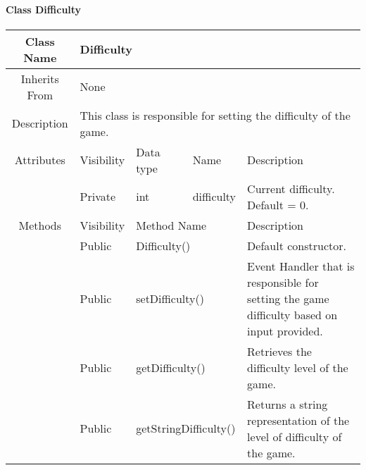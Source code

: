 \paragraph{Class Difficulty}\mbox{}
\begin{tabularx}{\textwidth}{|c||l|l|l|X|}
    \hline
    \cellcolor{lightgray}Class Name & \multicolumn{4}{X|}{Difficulty}\\
    \hline
    \cellcolor{lightgray}Inherits From & \multicolumn{4}{X|}{None}\\
    \hline
    \cellcolor{lightgray}Description & \multicolumn{4}{p{12cm}|}{This class is responsible for setting the difficulty of the game.}\\
    \hline\hline
    
    \cellcolor{lightgray}Attributes & \cellcolor{lightgray}Visibility & \cellcolor{lightgray}Data type & \cellcolor{lightgray}Name & \cellcolor{lightgray}Description\\\cline{2-5}
    \cellcolor{lightgray} & Private & int & difficulty & Current difficulty. Default = 0.\\
    \hline\hline
    
    \cellcolor{lightgray}Methods & \cellcolor{lightgray}Visibility & \multicolumn{2}{l|}{\cellcolor{lightgray}Method Name} & \cellcolor{lightgray}Description\\\cline{2-5}
    \cellcolor{lightgray} & Public & \multicolumn{2}{l|}{Difficulty()} & Default constructor.\\\cline{2-5}
    \cellcolor{lightgray} & Public & \multicolumn{2}{l|}{setDifficulty()} & Event Handler that is responsible for setting the game difficulty based on input provided.\\\cline{2-5}
    \cellcolor{lightgray} & Public & \multicolumn{2}{l|}{getDifficulty()} & Retrieves the difficulty level of the game.\\\cline{2-5}
    \cellcolor{lightgray} & Public & \multicolumn{2}{l|}{getStringDifficulty()} & Returns a string representation of the level of difficulty of the game.\\
    \hline
\end{tabularx}